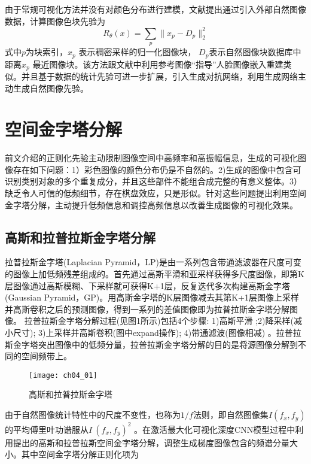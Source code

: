 	由于常规可视化方法并没有对颜色分布进行建模，文献\citep{Lenc2015}提出通过引入外部自然图像数据，计算图像色块先验为
\begin{equation} \label{eq:ch04_07}
       R_{\theta}(x)= \sum_{p}\parallel x_{p}-D_{p}\parallel _{2}^{2}
\end{equation}
式中$p$为块索引，$x_{p}$ 表示稠密采样的归一化图像块， $D_{p}$表示自然图像块数据库中距离$x_{p}$ 最近图像块。该方法跟文献\citep{Huang2017c}中利用参考图像“指导”人脸图像嵌入重建类似。并且基于数据的统计先验可进一步扩展，引入生成对抗网络，利用生成网络主动生成自然图像先验\citep{Nguyen2016a}。

 
 
\section{空间金字塔分解}
 
前文介绍的正则化先验主动限制图像空间中高频率和高振幅信息，生成的可视化图像存在如下问题：1）彩色图像的颜色分布仍是不自然的。2)生成的图像中包含可识别类别对象的多个重复成分，并且这些部件不能组合成完整的有意义整体。3）缺乏令人可信的低频细节，存在棋盘效应，只是形似。针对这些问题提出利用空间金字塔分解，主动提升低频信息和调控高频信息以改善生成图像的可视化效果。

\subsection{高斯和拉普拉斯金字塔分解}
 
拉普拉斯金字塔(Laplacian Pyramid，LP)\citep{Burt1983}是由一系列包含带通滤波器在尺度可变的图像上加低频残差组成的。首先通过高斯平滑和亚采样获得多尺度图像，即第K层图像通过高斯模糊、下采样就可获得K+1层，反复迭代多次构建高斯金字塔(Gaussian Pyramid，GP)。用高斯金字塔的K层图像减去其第K+1层图像上采样并高斯卷积之后的预测图像，得到一系列的差值图像即为拉普拉斯金字塔分解图像。
拉普拉斯金字塔分解过程(见图1所示)包括4个步骤: 1)高斯平滑 ;2)降采样(减小尺寸); 3)上采样并高斯卷积(图中expand操作); 4)带通滤波(图像相减)  。拉普拉斯金字塔突出图像中的低频分量，拉普拉斯金字塔分解的目的是将源图像分解到不同的空间频带上。
\begin{figure}[!htbp]
\centering
\texttt{[image: ch04\_01]}
\caption{高斯和拉普拉斯金字塔}
\label{fig:ch04_01}
\end{figure}

由于自然图像统计特性中的尺度不变性，也称为$1/f$法则\citep{VanderSchaaf1996a}，即自然图像集$I(f_{x},f_{y})$ 的平均傅里叶功谱服从$I~(f_{x},f_{y})^2$ 。在激活最大化可视化深度CNN模型过程中利用提出的高斯和拉普拉斯空间金字塔分解，调整生成梯度图像包含的频谱分量大小。其中空间金字塔分解正则化项为

